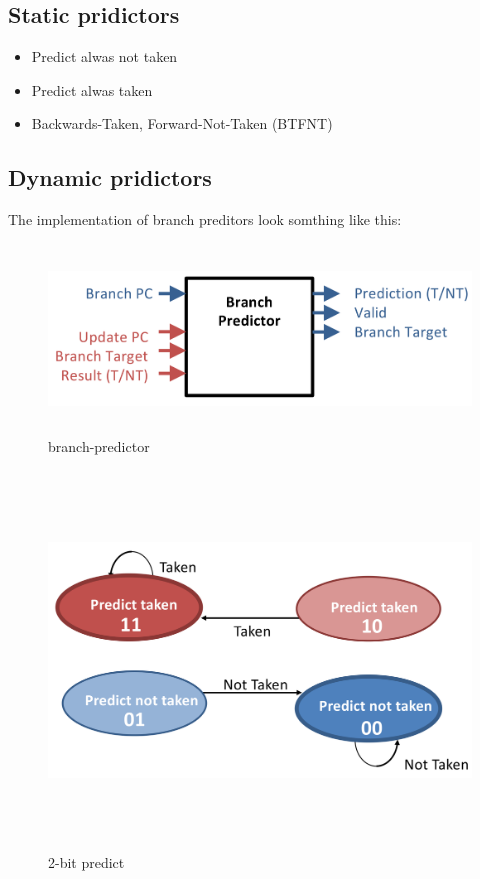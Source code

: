 \subsection{Static pridictors}
\begin{itemize}
\item  Predict alwas not taken
\item  Predict alwas taken
\item  Backwards-Taken, Forward-Not-Taken (BTFNT)
\end{itemize}


\newpage


\subsection{Dynamic pridictors}

The implementation of branch preditors look somthing like this:
\begin{figure}[h]
    \vspace{10mm}
    \centering
    \includegraphics[width=16cm, height=5cm]{image/branch-predictor.png} 
    \caption{branch-predictor}
\end{figure}


\begin{figure}[h]
    \vspace{10mm}
    \centering
    \includegraphics[width=16cm, height=10cm]{image/2-bit-predict.png} 
    \caption{2-bit predict}
\end{figure}

